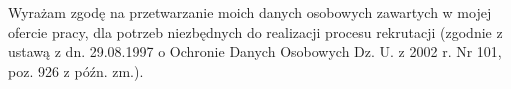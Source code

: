\documentclass[11pt,a4paper]{moderncv}
\begin{document}



%
%
\closesection{}
\footnotesize{}
Wyrażam zgodę na przetwarzanie moich danych osobowych zawartych w mojej ofercie pracy, dla potrzeb niezbędnych do realizacji procesu rekrutacji (zgodnie z ustawą z dn. 29.08.1997 o Ochronie Danych Osobowych Dz. U. z 2002 r. Nr 101, poz. 926 z późn. zm.).
\end{document}
